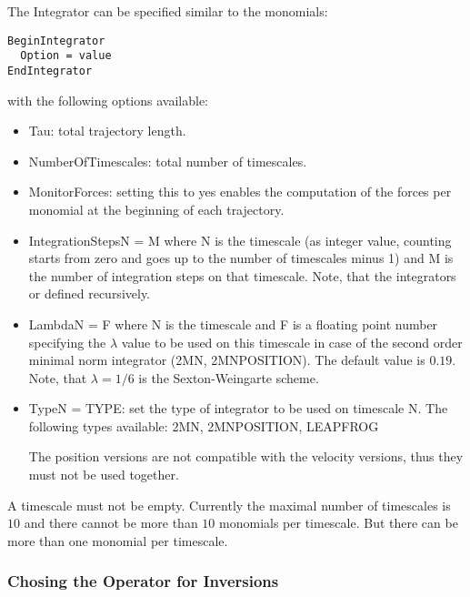 The Integrator can be specified similar to the monomials:
\begin{verbatim}
BeginIntegrator
  Option = value
EndIntegrator
\end{verbatim}
with the following options available:
\begin{itemize}
\item {\ttfamily Tau}: total trajectory length.
\item {\ttfamily NumberOfTimescales}: total number of timescales.
\item {\ttfamily MonitorForces}: setting this to {\ttfamily yes}
  enables the computation of the forces per monomial at the beginning
  of each trajectory.
\item {\ttfamily IntegrationStepsN = M} where {\ttfamily N} is the
  timescale (as integer value, counting starts from zero and goes up
  to the number of timescales minus 1) and {\ttfamily M} is the number
  of integration steps on that timescale. Note, that the integrators
  or defined recursively.
\item {\ttfamily LambdaN = F} where {\ttfamily N} is the
  timescale and {\ttfamily F} is a floating point number specifying
  the $\lambda$ value to be used on this timescale in case of the
  second order minimal norm integrator (2MN, 2MNPOSITION). The default
  value is $0.19$. Note, that $\lambda = 1/6$ is the Sexton-Weingarte
  scheme. 
\item {\ttfamily TypeN = TYPE}: set the type of integrator to be used
  on timescale {\ttfamily N}. The following types available:
  {\ttfamily 2MN, 2MNPOSITION, LEAPFROG}

  The position versions are not compatible with the velocity versions,
  thus they must not be used together.
\end{itemize}
A timescale must not be empty. Currently the maximal number of
timescales is $10$ and there cannot be more than $10$ monomials per
timescale. But there can be more than one monomial per timescale.

\subsubsection{Chosing the Operator for Inversions}

